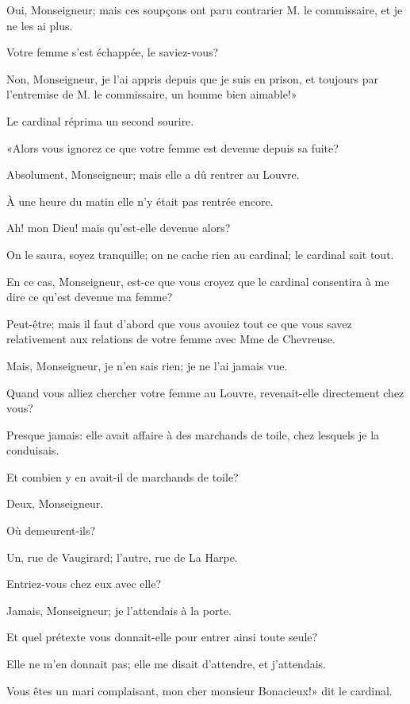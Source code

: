 \speak  Oui, Monseigneur; mais ces soupçons ont paru contrarier M. le commissaire, et je ne les ai plus. 

\speak  Votre femme s'est échappée, le saviez-vous? 

\speak  Non, Monseigneur, je l'ai appris depuis que je suis en prison, et toujours par l'entremise de M. le commissaire, un homme bien aimable!» 

Le cardinal réprima un second sourire. 

«Alors vous ignorez ce que votre femme est devenue depuis sa fuite? 

\speak  Absolument, Monseigneur; mais elle a dû rentrer au Louvre. 

\speak  À une heure du matin elle n'y était pas rentrée encore. 

\speak  Ah! mon Dieu! mais qu'est-elle devenue alors? 

\speak  On le saura, soyez tranquille; on ne cache rien au cardinal; le cardinal sait tout. 

\speak  En ce cas, Monseigneur, est-ce que vous croyez que le cardinal consentira à me dire ce qu'est devenue ma femme? 

\speak  Peut-être; mais il faut d'abord que vous avouiez tout ce que vous savez relativement aux relations de votre femme avec Mme de Chevreuse. 

\speak  Mais, Monseigneur, je n'en sais rien; je ne l'ai jamais vue. 

\speak  Quand vous alliez chercher votre femme au Louvre, revenait-elle directement chez vous? 

\speak  Presque jamais: elle avait affaire à des marchands de toile, chez lesquels je la conduisais. 

\speak  Et combien y en avait-il de marchands de toile? 

\speak  Deux, Monseigneur. 

\speak  Où demeurent-ils? 

\speak  Un, rue de Vaugirard; l'autre, rue de La Harpe. 

\speak  Entriez-vous chez eux avec elle? 

\speak  Jamais, Monseigneur; je l'attendais à la porte. 

\speak  Et quel prétexte vous donnait-elle pour entrer ainsi toute seule? 

\speak  Elle ne m'en donnait pas; elle me disait d'attendre, et j'attendais. 

\speak  Vous êtes un mari complaisant, mon cher monsieur Bonacieux!» dit le cardinal. 

